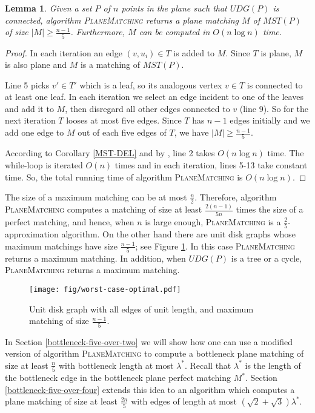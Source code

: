 \documentclass[11pt,a4paper]{article}
\newcommand{\MOPT}{M^*}
\newcommand{\btopt}{\lambda^*}
\newtheorem{lemma}{Lemma}
\begin{document}
\begin{lemma}
\label{n-minus-one-lemma}
Given a set $P$ of $n$ points in the plane such that $UDG(P)$ is connected, algorithm {\scshape PlaneMatching} returns a plane matching $M$ of $MST(P)$ of size $|M|\ge \frac{n-1}{5}$. Furthermore, $M$ can be computed in $O(n\log n)$ time.
\end{lemma}
\begin{proof}
In each iteration an edge $(v, u_i)\in T$ is added to $M$. Since $T$ is plane, $M$ is also plane and $M$ is a matching of $MST(P)$.

Line 5 picks $v'\in T'$ which is a leaf, so its analogous vertex $v\in T$ is connected to at least one leaf. In each iteration we select an edge incident to one of the leaves and add it to $M$, then disregard all other edges connected to $v$ (line 9). So for the next iteration $T$ looses at most five edges. Since $T$ has $n-1$ edges initially and we add one edge to $M$ out of each five edges of $T$, we have $|M|\ge\frac{n-1}{5}$. 

According to Corollary \ref{MST-DEL} and by \cite{Monma1992}, line 2 takes $O(n\log n)$ time. The while-loop is iterated $O(n)$ times and in each iteration, lines 5-13 take constant time. So, the total running time of algorithm {\scshape PlaneMatching} is $O(n\log n)$. 
\end{proof}

The size of a maximum matching can be at most $\frac{n}{2}$. Therefore, algorithm {\scshape PlaneMatching} computes a matching of size at least $\frac{2(n-1)}{5n}$ times the size of a perfect matching, and hence, when $n$ is large enough, {\scshape PlaneMatching} is a $\frac{2}{5}$-approximation algorithm. On the other hand there are unit disk graphs whose maximum matchings have size $\frac{n-1}{5}$; see Figure \ref{worst-case-optimal}. In this case {\scshape PlaneMatching} returns a maximum matching. In addition, when $UDG(P)$ is a tree or a cycle, {\scshape PlaneMatching} returns a maximum matching. 

\begin{figure}[ht]
  \centering
    \texttt{[image: fig/worst-case-optimal.pdf]}
  \caption{Unit disk graph with all edges of unit length, and maximum matching of size $\frac{n-1}{5}$.}
\label{worst-case-optimal}
\end{figure}

In Section \ref{bottleneck-five-over-two} we will show how one can use a modified version of algorithm {\scshape PlaneMatching} to compute a bottleneck plane matching of size at least $\frac{n}{5}$ with bottleneck length at most $\btopt$. Recall that $\btopt$ is the length of the bottleneck edge in the bottleneck plane perfect matching $\MOPT$. Section \ref{bottleneck-five-over-four} extends this idea to an algorithm which computes a plane matching of size at least $\frac{2n}{5}$ with edges of length at most $(\sqrt{2}+\sqrt{3})\btopt$.
\end{document}
